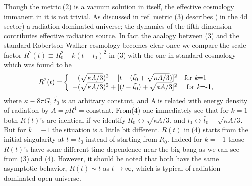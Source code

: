 \documentclass[a4paper,12pt]{article}
\begin{document}
 Though the metric (2) is a vacuum solution in itself, the
effective cosmology immanent in it is not trivial. As discussed in
ref.\cite{mat} metric (3) describes ( in the 4d sector) a
radiation-dominated universe; the dynamics of the fifth dimension
contributes effective radiation source. In fact the analogy
between (3) and the standard Robertson-Walker cosmology becomes
clear once we compare the scale factor $ R^2(t)\equiv R^2_0
-k(t-t_0)^2$ in (3) with the one in standard cosmology which was
found to be \cite{ste}
\begin{equation}
R^2(t)= \left\{\begin{array}{rl} (\sqrt{\kappa
A/3})^2-[t-(\tilde{t_0} + \sqrt{\kappa A/3})]^2 & \mbox{for {\it
k}=1}\\ -(\sqrt{\kappa A/3})^2 + [(t-\tilde{t_0}) + \sqrt{\kappa
A/3}]^2 & \mbox{ for {\it k}=-1} ,
\end{array}\right.
\end{equation}
 where $\kappa \equiv 8 \pi G$, $ \tilde{t_0}$ is an arbitrary
constant, and A is related with energy density of radiation by $
A=\rho R^4 =$constant. From(4) one immediately see that for $k=1$
both $R(t)$'s are identical if we identify $R_0 \leftrightarrow
\sqrt{\kappa A/3}$, and $t_0 \leftrightarrow \tilde{t_0} +
\sqrt{\kappa A/3}$.
 But for $k=-1$ the situation is a little bit different. $R(t)$ in
(4)
starts from the initial singularity at $t=t_0$ instead of starting
from $R_0$. Indeed for $k=-1$ those $R(t)$'s have some different
time dependence near the big-bang as we can see from (3) and (4).
However, it should be noted that both have the same asymptotic
behavior, $R(t) \sim t$ as $t \rightarrow \infty$, which is
typical of radiation-dominated open universe.
\end{document}
